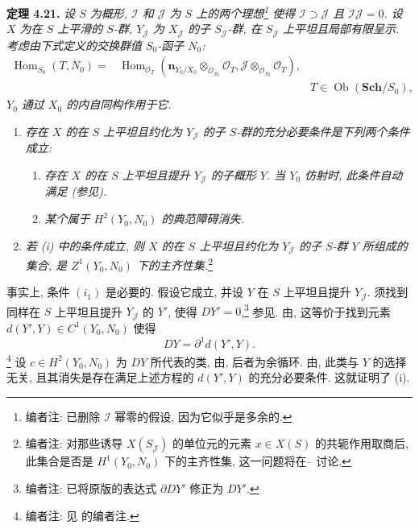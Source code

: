 \medskip
\noindent{}\textbf{定理 4.21.}
\textit{设 \(S\) 为概形, \(\mathscr I\) 和 \(\mathscr J\) 为 \(S\) 上的两个理想\footnote{编者注: 已删除 \(\mathscr I\) 幂零的假设, 因为它似乎是多余的.} 使得 \(\mathscr I\supset\mathscr J\) 且 \(\mathscr I\mathscr J=0\).
设 \(X\) 为在 \(S\) 上平滑的 \(S\)-群,
\(Y_{\mathscr J}\) 为 \(X_{\mathscr J}\) 的子 \(S_{\mathscr J}\)-群,
在 \(S_{\mathscr J}\) 上平坦且局部有限呈示.
考虑由下式定义的交换群值 \(S_0\)-函子 \(N_0\):}
\[
 \begin{aligned}
 \operatorname{Hom}_{S_0}(T,N_0)
 ={}&\operatorname{Hom}_{\mathscr O_T}
 \left(
  \mathbf n_{Y_0/X_0}\otimes_{\mathscr O_{S_0}}\mathscr O_T,
  \mathscr J\otimes_{\mathscr O_{S_0}}\mathscr O_T
 \right),\\[-0.2em]
 &\hspace{17em}T\in\operatorname{Ob}(\mathbf{Sch}/S_0),
 \end{aligned}
\]
\textit{\(Y_0\) 通过 \(X_0\) 的内自同构作用于它.}
\begin{enumerate}
\item[(i)] \textit{存在 \(X\) 的在 \(S\) 上平坦且约化为
\(Y_{\mathscr J}\) 的子 \(S\)-群的充分必要条件是下列两个条件成立:}
  \begin{enumerate}
  \item[\((i_1)\)] \textit{存在 \(X\) 的在 \(S\) 上平坦且提升 \(Y_{\mathscr J}\) 的子概形 \(Y\).
当 \(Y_0\) 仿射时, 此条件自动满足 (参见).}
  \item[\((i_2)\)] \textit{某个属于 \(H^2(Y_0,N_0)\) 的典范障碍消失.}
  \end{enumerate}
\item[\SGAInlineRefTarget{sga3:iii:theorem:4-21:item:ii}(ii)] \textit{若 (i) 中的条件成立, 则 \(X\) 的在 \(S\) 上平坦且约化为
\(Y_{\mathscr J}\) 的子 \(S\)-群 \(Y\) 所组成的集合,
是 \(Z^1(Y_0,N_0)\) 下的主齐性集.}\footnote{编者注: 对那些诱导 \(X(S_{\mathscr J})\) 的单位元的元素
\(x\in X(S)\) 的共轭作用取商后, 此集合是否是
\(H^1(Y_0,N_0)\) 下的主齐性集,
这一问题将在-- 讨论.}
\end{enumerate}

事实上, 条件 \((i_1)\) 是必要的. 假设它成立,
并设 \(Y\) 在 \(S\) 上平坦且提升 \(Y_{\mathscr J}\).
须找到同样在 \(S\) 上平坦且提升 \(Y_{\mathscr J}\) 的 \(Y'\),
使得 \(DY'=0\),\footnote{编者注: 已将原版的表达式 \(\partial DY'\) 修正为 \(DY'\).} 参见.
由, 这等价于找到元素
\(d(Y',Y)\in C^1(Y_0,N_0)\) 使得
\[
 DY=\partial^1d(Y',Y).
\]
\footnote{编者注: 见 的编者注.}
设 \(c\in H^2(Y_0,N_0)\) 为 \(DY\) 所代表的类,
由, 后者为余循环.
由, 此类与 \(Y\) 的选择无关,
且其消失是存在满足上述方程的 \(d(Y',Y)\) 的充分必要条件.
这就证明了 (i).

